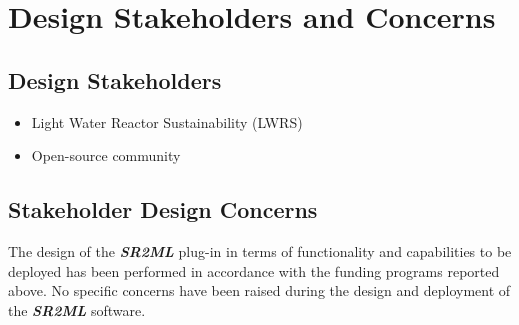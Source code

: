\section{Design Stakeholders and Concerns}
\subsection{Design Stakeholders}
\begin{itemize}
  \item Light Water Reactor Sustainability (LWRS)
  \item Open-source community
\end{itemize}
\subsection{Stakeholder Design Concerns}
The design of the \textbf{\textit{SR2ML}} plug-in in terms of functionality and capabilities to be deployed has been performed in
accordance with the funding programs reported above. No specific concerns have been raised during the design and
deployment of the \textbf{\textit{SR2ML}} software.
